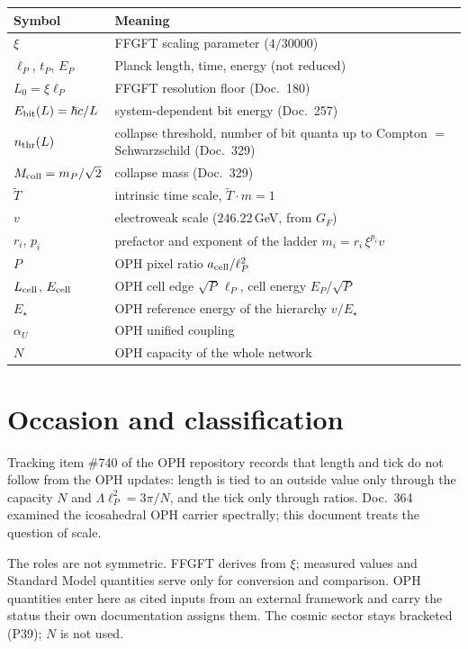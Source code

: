 \medskip
\begin{tabular}{@{}lp{10cm}@{}}
\toprule
\textbf{Symbol} & \textbf{Meaning} \\
\midrule
$\xi$ & FFGFT scaling parameter ($4/30000$) \\
$\ell_P$, $t_P$, $E_P$ & Planck length, time, energy (not reduced) \\
$L_0=\xi\ell_P$ & FFGFT resolution floor (Doc.~180) \\
$E_{\rm bit}(L)=\hbar c/L$ & system-dependent bit energy (Doc.~257) \\
$n_{\rm thr}(L)$ & collapse threshold, number of bit quanta up to Compton $=$ Schwarzschild (Doc.~329) \\
$M_{\rm coll}=m_P/\sqrt2$ & collapse mass (Doc.~329) \\
$\tilde T$ & intrinsic time scale, $\tilde T\cdot m=1$ \\
$v$ & electroweak scale ($246.22$\,GeV, from $G_F$) \\
$r_i$, $p_i$ & prefactor and exponent of the ladder $m_i=r_i\,\xi^{p_i}v$ \\
\midrule
$P$ & OPH pixel ratio $a_{\rm cell}/\ell_P^2$ \\
$L_{\rm cell}$, $E_{\rm cell}$ & OPH cell edge $\sqrt P\,\ell_P$, cell energy $E_P/\sqrt P$ \\
$E_\star$ & OPH reference energy of the hierarchy $v/E_\star$ \\
$\alpha_U$ & OPH unified coupling \\
$N$ & OPH capacity of the whole network \\
\bottomrule
\end{tabular}

\section{Occasion and classification}

Tracking item \#740 of the OPH repository records that length and tick do not
follow from the OPH updates: length is tied to an outside value only through
the capacity $N$ and $\Lambda\ell_P^2=3\pi/N$, and the tick only through
ratios. Doc.~364 examined the icosahedral OPH carrier spectrally; this
document treats the question of scale.

The roles are not symmetric. FFGFT derives from $\xi$; measured values and
Standard Model quantities serve only for conversion and comparison. OPH
quantities enter here as cited inputs from an external framework \QM{} and
carry the status their own documentation assigns them. The cosmic sector
stays bracketed (P39); $N$ is not used.

